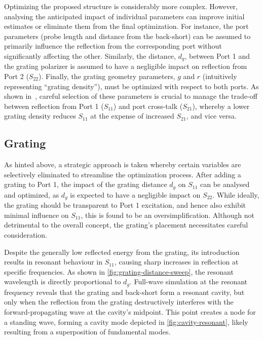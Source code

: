 \documentclass[11pt,a4paper,twoside,openany]{report}
\begin{document}
Optimizing the proposed structure is considerably more complex. However, analysing the anticipated impact of individual parameters can improve initial estimates or eliminate them from the final optimization. For instance, the port parameters (probe length and distance from the back-short) can be assumed to primarily influence the reflection from the corresponding port without significantly affecting the other. Similarly, the distance, $d_g$, between Port 1 and the grating polarizer is assumed to have a negligible impact on reflection from Port 2 ($S_{22}$). Finally, the grating geometry parameters, $g$ and $r$ (intuitively representing \enquote{grating density}), must be optimized with respect to both ports. As shown in~\parencite{karki-et-al:dual-polarized-probe-for-planar-near-field-measurement}, careful selection of these parameters is crucial to manage the trade-off between reflection from Port 1 ($S_{11}$) and port cross-talk ($S_{21}$), whereby a lower grating density reduces $S_{11}$ at the expense of increased $S_{21}$, and vice versa.

\subsection{Grating}
\label{subsection:grating}
As hinted above, a strategic approach is taken whereby certain variables are selectively eliminated to streamline the optimization process. After adding a grating to Port 1, the impact of the grating distance $d_g$ on $S_{11}$ can be analysed and optimized, as $d_g$ is expected to have a negligible impact on $S_{22}$. While ideally, the grating should be transparent to Port 1 excitation, and hence also exhibit minimal influence on $S_{11}$, this is found to be an oversimplification. Although not detrimental to the overall concept, the grating's placement necessitates careful consideration.

Despite the generally low reflected energy from the grating, its introduction results in resonant behaviour in $S_{11}$, causing sharp increases in reflection at specific frequencies. As shown in \cref{fig:grating-distance-sweep}, the resonant wavelength is directly proportional to $d_g$. Full-wave simulation at the resonant frequency reveals that the grating and back-short form a resonant cavity, but only when the reflection from the grating destructively interferes with the forward-propagating wave at the cavity's midpoint. This point creates a node for a standing wave, forming a cavity mode depicted in \cref{fig:cavity-resonant}, likely resulting from a superposition of fundamental modes.
\end{document}
